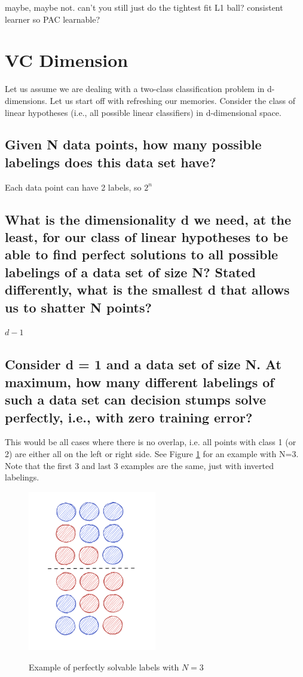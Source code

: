 \documentclass[11pt,a4paper]{article}
\begin{document}
maybe, maybe not. can't you still just do the tightest fit L1 ball?
consistent learner so PAC learnable?

\clearpage
\section{VC Dimension}
\label{sec:VC}
Let us assume we are dealing with a two-class classification problem in d-dimensions.
Let us start off with refreshing our memories. Consider the class of linear hypotheses (i.e.,
all possible linear classifiers) in d-dimensional space.

\subsection{Given N data points, how many possible labelings does this data set have?}
\label{sec:2a}
Each data point can have 2 labels, so $2^n$

\subsection{What is the dimensionality d we need, at the least, for our class of linear hypotheses to
be able to find perfect solutions to all possible labelings of a data set of size N? Stated
differently, what is the smallest d that allows us to shatter N points?}
\label{sec:2b}
$d - 1$ 


\subsection{Consider d = 1 and a data set of size N. At maximum, how many different labelings of
such a data set can decision stumps solve perfectly, i.e., with zero training error?}
\label{sec:2c}
This would be all cases where there is no overlap, i.e. all points with class 1 (or 2) are either all on the left or right side. See Figure \ref{fig:stump} for an example with N=3. Note that the first 3 and last 3 examples are the same, just with inverted labelings.

\begin{figure}[h]
    \caption{Example of perfectly solvable labels with $N=3$}
    \centering
    \includegraphics[width=0.5\textwidth]{stump.png}
    \label{fig:stump}
\end{figure}
\end{document}
